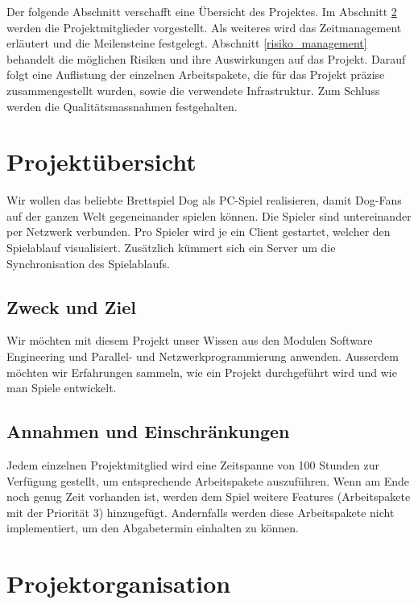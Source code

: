 \documentclass[12pt,halfparskip]{scrartcl}
\begin{document}
Der folgende Abschnitt verschafft eine Übersicht des Projektes. Im Abschnitt \ref{projektorganisation} werden die Projektmitglieder vorgestellt. Als weiteres wird das Zeitmanagement erläutert und die Meilensteine festgelegt. Abschnitt \ref{risiko_management} behandelt die möglichen Risiken und ihre Auswirkungen auf das Projekt. Darauf folgt eine Auflistung der einzelnen Arbeitspakete, die für das Projekt präzise zusammengestellt wurden, sowie die verwendete Infrastruktur. Zum Schluss werden die Qualitätsmassnahmen festgehalten.


\section{Projektübersicht}

Wir wollen das beliebte Brettspiel Dog als PC-Spiel realisieren, damit Dog-Fans auf der ganzen Welt gegeneinander spielen können. Die Spieler sind untereinander per Netzwerk verbunden. Pro Spieler wird je ein Client gestartet, welcher den Spielablauf visualisiert. Zusätzlich kümmert sich ein Server um die Synchronisation des Spielablaufs.


\subsection{Zweck und Ziel}

Wir möchten mit diesem Projekt unser Wissen aus den Modulen Software Engineering und Parallel- und Netzwerkprogrammierung anwenden. Ausserdem möchten wir Erfahrungen sammeln, wie ein Projekt durchgeführt wird und wie man Spiele entwickelt.

\subsection{Annahmen und Einschränkungen}

Jedem einzelnen Projektmitglied wird eine Zeitspanne von 100 Stunden zur Verfügung gestellt, um entsprechende Arbeitspakete auszuführen. Wenn am Ende noch genug Zeit vorhanden ist, werden dem Spiel weitere Features (Arbeitspakete mit der Priorität 3) hinzugefügt. Andernfalls werden diese Arbeitspakete nicht implementiert, um den Abgabetermin einhalten zu können.


\section{Projektorganisation}
\label{projektorganisation}
\end{document}
